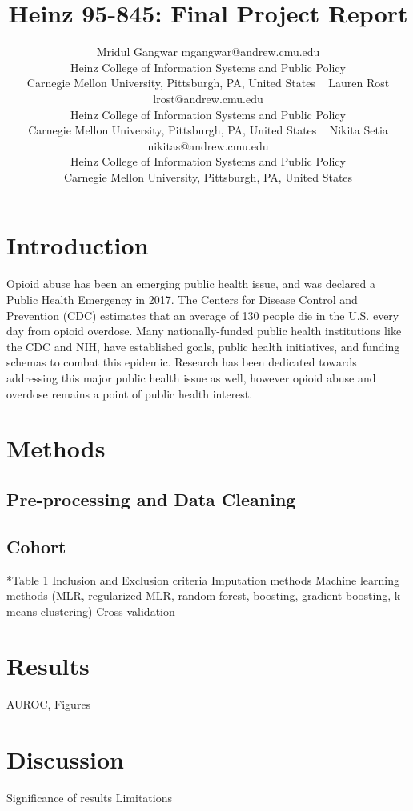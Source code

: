 \documentclass[twoside,10.5pt]{article}
\let\footnote=\endnote
\begin{document}
\title{Heinz 95-845: Final Project Report}

\author{\name Mridul Gangwar \email mgangwar@andrew.cmu.edu \\
       \addr Heinz College of Information Systems and Public Policy\\
       Carnegie Mellon University, Pittsburgh, PA, United States \
       \AND
       \name Lauren Rost \email lrost@andrew.cmu.edu \\
       \addr Heinz College of Information Systems and Public Policy\\
       Carnegie Mellon University, Pittsburgh, PA, United States \
       \AND
       \name Nikita Setia \email nikitas@andrew.cmu.edu \\
       \addr Heinz College of Information Systems and Public Policy\\
       Carnegie Mellon University, Pittsburgh, PA, United States}

\section{Introduction}
Opioid abuse has been an emerging public health issue, and was declared a Public Health Emergency in 2017\footnote{\cite{HHS}}. The Centers for Disease Control and Prevention (CDC) estimates that an average of 130 people die in the U.S. every day from opioid overdose\footnote{\cite{Wonder}}. Many nationally-funded public health institutions like the CDC and NIH, have established goals, public health initiatives, and funding schemas to combat this epidemic\footnote{\cite{CADCA}}\footnote{\cite{CDC_OO}}\footnote{\cite{NationalInstitute}}. Research has been dedicated towards addressing this major public health issue as well, however opioid abuse and overdose remains a point of public health interest.   

\section{Methods}
\subsection{Pre-processing and Data Cleaning}
\subsection{Cohort}
*Table 1
Inclusion and Exclusion criteria 
Imputation methods
Machine learning methods (MLR, regularized MLR, random forest, boosting, gradient boosting, k-means clustering)
Cross-validation


\section{Results}
AUROC, Figures 

\section{Discussion}
Significance of results
Limitations 

\newpage
\theendnotes


\end{document}
